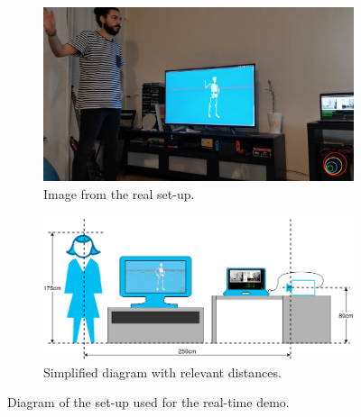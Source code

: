 \begin{figure}[h]\centering
    \begin{subfigure}{\textwidth}\centering
        \includegraphics[width=\textwidth]{figures/real_setup.png} 
        \caption{Image from the real set-up.}
        \label{subfig:real_setup}
    \end{subfigure}
    \begin{subfigure}{\textwidth}\centering
        \includegraphics[width=\textwidth]{figures/setup.png}
        \caption{Simplified diagram with relevant distances.}
        \label{subfig:simple_setup}
    \end{subfigure}
    \caption{Diagram of the set-up used for the real-time demo.}
    \label{fig:setup}
\end{figure}

